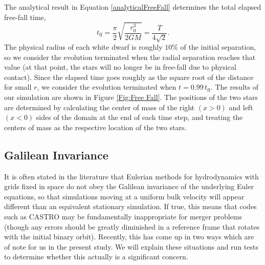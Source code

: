 \documentclass[12pt,preprint]{aastex}
\begin{document}
The analytical result in Equation \ref{analyticalFreeFall} determines
the total elapsed free-fall time,
\begin{equation}
  t_{\text{ff}} = \frac{\pi}{2} \sqrt{\frac{r_0^3}{2GM}} = \frac{T}{4\sqrt{2}}.
\end{equation}
The physical radius of each white dwarf is roughly $10\%$ of the
initial separation, so we consider the evolution terminated when the
radial separation reaches that value (at that point, the stars will no
longer be in free-fall due to physical contact). Since the elapsed
time goes roughly as the square root of the distance for small $r$, we
consider the evolution terminated when $t = 0.99\, t_{\text{ff}}$. The
results of our simulation are shown in Figure \ref{Fig:Free Fall}. The
positions of the two stars are determined by calculating the center of
mass of the right $(x > 0)$ and left $(x < 0)$ sides of the domain at 
the end of each time step, and treating the centers of mass as the 
respective location of the two stars.

\subsection{Galilean Invariance}\label{sec:galileo}

It is often stated in the literature that Eulerian methods for hydrodynamics with grids fixed in space do not obey the Galilean invariance of the underlying Euler equations, so that simulations moving at a uniform bulk velocity will appear different than an equivalent stationary simulation. If true, this means that codes such as CASTRO may be fundamentally inappropriate for merger problems (though any errors should be greatly diminished in a reference frame that rotates with the initial binary orbit). Recently, this has come up in two ways which are of note for us in the present study. We will explain these situations and run tests to determine whether this actually is a significant concern.
\end{document}
